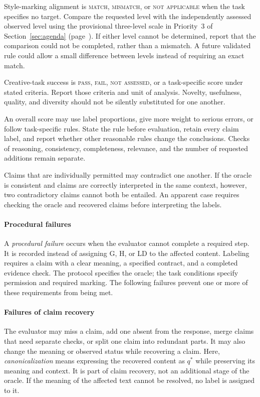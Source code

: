\documentclass{clv2025}
\newcommand{\LD}{\textsc{LD}}
\newcommand{\Hall}{\textsc{H}}
\newcommand{\Grd}{\textsc{G}}
\begin{document}
Style-marking alignment is \textsc{match}, \textsc{mismatch}, or
\textsc{not applicable} when the task specifies no target. Compare the requested
level with the independently assessed observed level using the provisional
three-level scale in Priority~3 of Section~\ref{sec:agenda}
(page~\pageref{par:style-scale}). If either level cannot be determined,
report that the comparison could not be completed, rather than a mismatch.
A future validated rule could allow a small difference between levels
instead of requiring an exact match.

Creative-task success is \textsc{pass}, \textsc{fail}, \textsc{not assessed},
or a task-specific score under stated criteria. Report those criteria and
unit of analysis. Novelty, usefulness, quality, and diversity should not be
silently substituted for one another.

An overall score may use label proportions, give more weight to serious
errors, or follow task-specific rules. State the rule before evaluation,
retain every claim label, and report whether other reasonable rules change
the conclusions. Checks of reasoning, consistency, completeness, relevance,
and the number of requested additions remain separate.

Claims that are individually permitted may contradict one another. If the
oracle is consistent and claims are correctly interpreted in the same context,
however, two contradictory claims cannot both be entailed. An apparent case
requires checking the oracle and recovered claims before interpreting the labels.

\paragraph{Procedural failures}

A \emph{procedural failure} occurs when the evaluator cannot complete a
required step. It is recorded instead of assigning \Grd, \Hall, or \LD{} to
the affected content. Labeling requires a claim with a clear meaning, a
specified contract, and a completed evidence check. The protocol specifies
the oracle; the task conditions specify permission and required marking.
The following failures prevent one or more of these requirements from being met.

\paragraph{Failures of claim recovery}
The evaluator may miss a claim, add one absent from the response, merge claims
that need separate checks, or split one claim into redundant parts. It may
also change the meaning or observed status while recovering a claim.
Here, \emph{canonicalization} means expressing the recovered content as
$q^*$ while preserving its meaning and context. It is part of claim recovery,
not an additional stage of the oracle. If the meaning of the affected text
cannot be resolved, no label is assigned to it.
\end{document}
